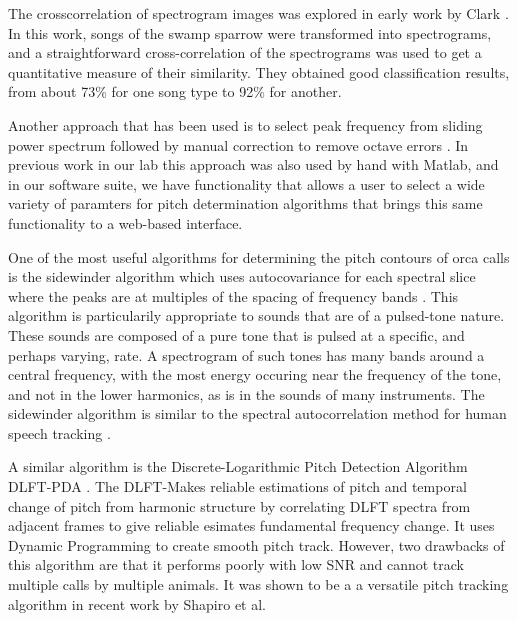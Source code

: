 \documentclass[12pt,oneside]{book}
\begin{document}
The crosscorrelation of spectrogram images was explored in early work
by Clark \cite{clark87}.  In this work, songs of the swamp sparrow
were transformed into spectrograms, and a straightforward
cross-correlation of the spectrograms was used to get a quantitative
measure of their similarity.  They obtained good classification
results, from about 73\% for one song type to 92\% for another.

Another approach that has been used is to select peak frequency from
sliding power spectrum followed by manual correction to remove octave
errors \cite{buck93} \cite{janik94}.  In previous work in our lab
\cite{ness08} this approach was also used by hand with Matlab, and in
our software suite, we have functionality that allows a user to select
a wide variety of paramters for pitch determination algorithms that
brings this same functionality to a web-based interface.

One of the most useful algorithms for determining the pitch contours
of orca calls is the sidewinder algorithm which uses autocovariance
for each spectral slice where the peaks are at multiples of the
spacing of frequency bands \cite{deeke99}.  This algorithm is
particularily appropriate to sounds that are of a pulsed-tone nature.
These sounds are composed of a pure tone that is pulsed at a specific,
and perhaps varying, rate.  A spectrogram of such tones has many bands
\cite{watkins67} around a central frequency, with the most energy
occuring near the frequency of the tone, and not in the lower
harmonics, as is in the sounds of many instruments.  The sidewinder
algorithm is similar to the spectral autocorrelation method for human
speech tracking \cite{lahat87}.

A similar algorithm is the Discrete-Logarithmic Pitch Detection
Algorithm DLFT-PDA \cite{wang00}.  The DLFT-Makes reliable estimations
of pitch and temporal change of pitch from harmonic structure by
correlating DLFT spectra from adjacent frames to give reliable
esimates fundamental frequency change.  It uses Dynamic Programming to
create smooth pitch track.  However, two drawbacks of this algorithm
are that it performs poorly with low SNR and cannot track multiple
calls by multiple animals.  It was shown to be a a versatile pitch
tracking algorithm in recent work by Shapiro et al. \cite{shapiro09}
\end{document}

